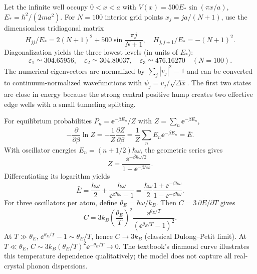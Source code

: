 Let the infinite well occupy $0<x<a$
with $V(x)=500E_*\sin(\pi x/a)$,
$E_*=\hbar^2/(2ma^2)$.
For $N=100$ interior grid points
$x_j=ja/(N+1)$, use the dimensionless
tridiagonal matrix
\begin{equation}
\boxed{H_{jj}/E_*=2(N+1)^2+
500\sin\frac{\pi j}{N+1},\quad
H_{j,j\pm1}/E_*=-(N+1)^2}.
\end{equation}
Diagonalization yields the three lowest levels
(in units of $E_*$):
\begin{equation}
\boxed{\varepsilon_1\simeq304.65956,\quad
\varepsilon_2\simeq304.80037,\quad
\varepsilon_3\simeq476.16270}
\quad(N=100).
\end{equation}
The numerical eigenvectors are normalized by
$\sum_j|v_j|^2=1$ and can be converted to
continuum-normalized wavefunctions with
$\psi_j=v_j/\sqrt{\Delta x}$.
The first two states are close in energy
because the strong central positive hump
creates two effective edge wells with a
small tunneling splitting.

For equilibrium probabilities
$P_n=\ee^{-\beta E_n}/Z$ with
$Z=\sum_n\ee^{-\beta E_n}$,
\begin{equation}
-\frac{\partial}{\partial\beta}\ln Z
=-\frac1Z\frac{\partial Z}{\partial\beta}
=\frac1Z\sum_n E_n\ee^{-\beta E_n}
=\boxed{\bar E}.
\end{equation}
With oscillator energies $E_n=(n+1/2)\hbar\omega$,
the geometric series gives
\begin{equation}
\boxed{Z=\frac{\ee^{-\beta\hbar\omega/2}}
{1-\ee^{-\beta\hbar\omega}}}.
\end{equation}
Differentiating its logarithm yields
\begin{equation}
\boxed{\bar E=\frac{\hbar\omega}{2}
+\frac{\hbar\omega}{\ee^{\beta\hbar\omega}-1}
=\frac{\hbar\omega}{2}
\frac{1+\ee^{-\beta\hbar\omega}}
{1-\ee^{-\beta\hbar\omega}}}.
\end{equation}
For three oscillators per atom, define
$\theta_E=\hbar\omega/k_B$.
Then $C=3\,\partial\bar E/\partial T$ gives
\begin{equation}
\boxed{C=3k_B
\left(\frac{\theta_E}{T}\right)^2
\frac{\ee^{\theta_E/T}}
{(\ee^{\theta_E/T}-1)^2}}.
\end{equation}
At $T\gg\theta_E$,
$\ee^{\theta_E/T}-1\sim\theta_E/T$, hence
$C\to3k_B$ (classical Dulong--Petit limit).
At $T\ll\theta_E$,
$C\sim3k_B(\theta_E/T)^2\ee^{-\theta_E/T}\to0$.
The textbook's diamond curve illustrates
this temperature dependence qualitatively;
the model does not capture all real-crystal
phonon dispersions.

